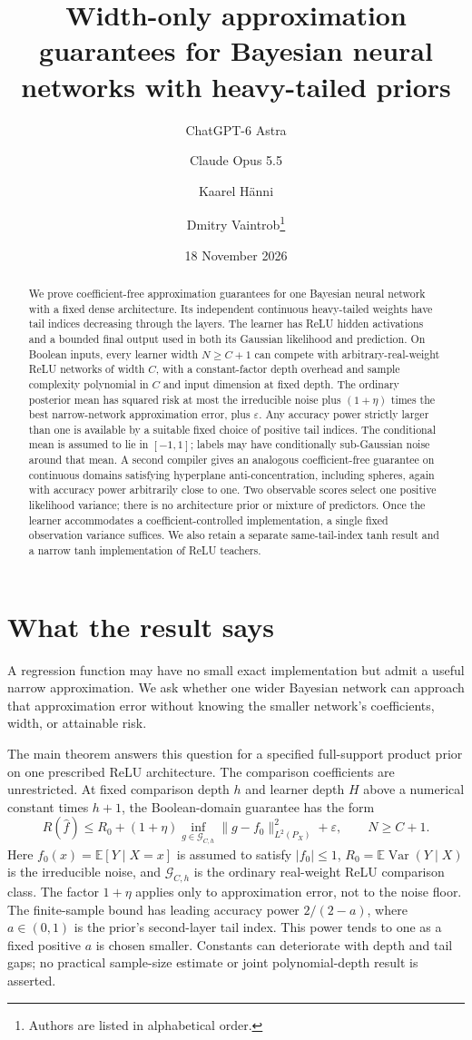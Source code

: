 \documentclass[11pt]{article}
\title{Width-only approximation guarantees for Bayesian neural networks with heavy-tailed priors}
\author{ChatGPT-6 Astra \and Claude Opus 5.5 \and Kaarel H\"anni \and Dmitry Vaintrob\thanks{Authors are listed in alphabetical order.}}
\date{18 November 2026}
\newcommand{\E}{\mathbb E}
\begin{document}
\maketitle
\begin{abstract}
We prove coefficient-free approximation guarantees for one Bayesian neural network with a fixed dense architecture. Its independent continuous heavy-tailed weights have tail indices decreasing through the layers. The learner has ReLU hidden activations and a bounded final output used in both its Gaussian likelihood and prediction. On Boolean inputs, every learner width $N\ge C+1$ can compete with arbitrary-real-weight ReLU networks of width $C$, with a constant-factor depth overhead and sample complexity polynomial in $C$ and input dimension at fixed depth. The ordinary posterior mean has squared risk at most the irreducible noise plus $(1+\eta)$ times the best narrow-network approximation error, plus $\varepsilon$. Any accuracy power strictly larger than one is available by a suitable fixed choice of positive tail indices. The conditional mean is assumed to lie in $[-1,1]$; labels may have conditionally sub-Gaussian noise around that mean. A second compiler gives an analogous coefficient-free guarantee on continuous domains satisfying hyperplane anti-concentration, including spheres, again with accuracy power arbitrarily close to one. Two observable scores select one positive likelihood variance; there is no architecture prior or mixture of predictors. Once the learner accommodates a coefficient-controlled implementation, a single fixed observation variance suffices. We also retain a separate same-tail-index tanh result and a narrow tanh implementation of ReLU teachers.
\end{abstract}

\section*{What the result says}
A regression function may have no small exact implementation but admit a useful narrow approximation. We ask whether one wider Bayesian network can approach that approximation error without knowing the smaller network's coefficients, width, or attainable risk.

The main theorem answers this question for a specified full-support product prior on one prescribed ReLU architecture. The comparison coefficients are unrestricted. At fixed comparison depth $h$ and learner depth $H$ above a numerical constant times $h+1$, the Boolean-domain guarantee has the form
\[
 R(\widehat f)\le R_0+(1+\eta)
       \inf_{g\in\mathcal G_{C,h}}\|g-f_0\|_{L^2(P_X)}^2+\varepsilon,
 \qquad N\ge C+1.
\]
Here $f_0(x)=\E[Y\mid X=x]$ is assumed to satisfy $|f_0|\le1$, $R_0=\E\operatorname{Var}(Y\mid X)$ is the irreducible noise, and $\mathcal G_{C,h}$ is the ordinary real-weight ReLU comparison class. The factor $1+\eta$ applies only to approximation error, not to the noise floor. The finite-sample bound has leading accuracy power $2/(2-a)$, where $a\in(0,1)$ is the prior's second-layer tail index. This power tends to one as a fixed positive $a$ is chosen smaller. Constants can deteriorate with depth and tail gaps; no practical sample-size estimate or joint polynomial-depth result is asserted.
\end{document}
